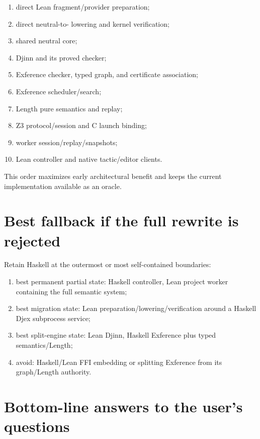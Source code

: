 \documentclass[10pt,letterpaper,oneside]{report}
\newcommand{\code}[1]{\texttt{\detokenize{#1}}}
\begin{document}
\begin{enumerate}
  \item direct Lean fragment/provider preparation;
  \item direct neutral-to-\code{Expr} lowering and kernel verification;
  \item shared neutral core;
  \item Djinn and its proved checker;
  \item Exference checker, typed graph, and certificate association;
  \item Exference scheduler/search;
  \item Length pure semantics and replay;
  \item Z3 protocol/session and C launch binding;
  \item worker session/replay/snapshots;
  \item Lean controller and native tactic/editor clients.
\end{enumerate}

This order maximizes early architectural benefit and keeps the current implementation available as an oracle.

\section{Best fallback if the full rewrite is rejected}

Retain Haskell at the outermost or most self-contained boundaries:

\begin{enumerate}
  \item best permanent partial state: Haskell controller, Lean project worker containing the full semantic system;
  \item best migration state: Lean preparation/lowering/verification around a Haskell Djex subprocess service;
  \item best split-engine state: Lean Djinn, Haskell Exference plus typed semantics/Length;
  \item avoid: Haskell/Lean FFI embedding or splitting Exference from its graph/Length authority.
\end{enumerate}

\section{Bottom-line answers to the user's questions}
\end{document}
